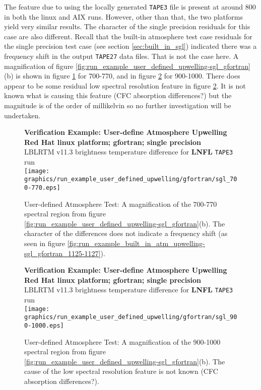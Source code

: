 The feature due to using the locally generated \texttt{TAPE3} file is present at around 800\invcm{} in both the linux and AIX runs. However, other than that, the two platforms yield very similar results. The character of the single precision residuals for this case are also different. Recall that the built-in atmosphere test case residuals for the single precision test case (see section \ref{sec:built_in_sgl}) indicated there was a frequency shift in the output \texttt{TAPE27} data files. That is not the case here. A magnification of figure \ref{fig:run_example_user_defined_upwelling-sgl_gfortran}(b) is shown in figure \ref{fig:run_example_user_defined_upwelling-sgl_700-770} for 700-770\invcm, and in figure \ref{fig:run_example_user_defined_upwelling-sgl_900-1000} for 900-1000\invcm. There does appear to be some residual low spectral resolution feature in figure \ref{fig:run_example_user_defined_upwelling-sgl_900-1000}. It is not known what is causing this feature (CFC absorption differences?) but the magnitude is of the order of millikelvin so no further investigation will be undertaken.

\begin{figure}[htp]
  \centering
  \qquad\sffamily\textbf{Verification Example: User-define Atmosphere Upwelling}\\
  \qquad\sffamily\textbf{Red Hat linux platform; gfortran; single precision}\\
  \qquad\textsf{LBLRTM v11.3 brightness temperature difference for \textbf{LNFL} \texttt{TAPE3} run}\\
  \texttt{[image: graphics/run\_example\_user\_defined\_upwelling/gfortran/sgl\_700-770.eps]}
  \caption{User-defined Atmosphere Test: A magnification of the 700-770\invcm{} spectral region from figure \ref{fig:run_example_user_defined_upwelling-sgl_gfortran}(b). The character of the differences does not indicate a frequency shift (as seen in figure \ref{fig:run_example_built_in_atm_upwelling-sgl_gfortran_1125-1127}).}
  \label{fig:run_example_user_defined_upwelling-sgl_700-770}
\end{figure}

\begin{figure}[htp]
  \centering
  \qquad\sffamily\textbf{Verification Example: User-define Atmosphere Upwelling}\\
  \qquad\sffamily\textbf{Red Hat linux platform; gfortran; single precision}\\
  \qquad\textsf{LBLRTM v11.3 brightness temperature difference for \textbf{LNFL} \texttt{TAPE3} run}\\
  \texttt{[image: graphics/run\_example\_user\_defined\_upwelling/gfortran/sgl\_900-1000.eps]}
  \caption{User-defined Atmosphere Test: A magnification of the 900-1000\invcm{} spectral region from figure \ref{fig:run_example_user_defined_upwelling-sgl_gfortran}(b). The cause of the low spectral resolution feature is not known (CFC absorption differences?).}
  \label{fig:run_example_user_defined_upwelling-sgl_900-1000}
\end{figure}
